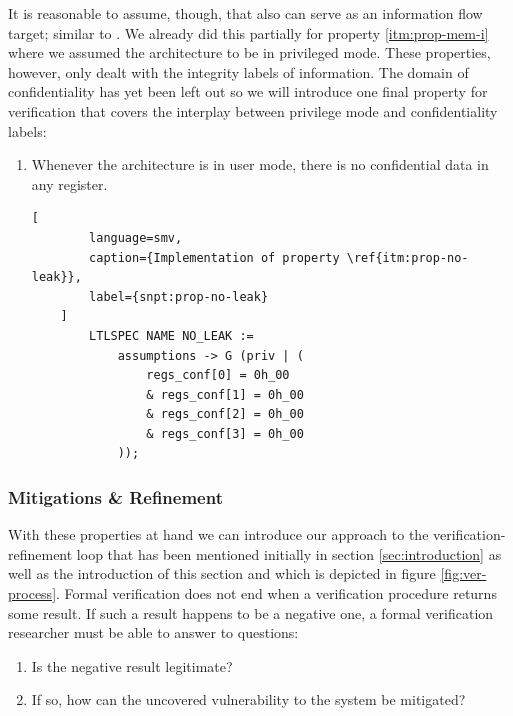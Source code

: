 It is reasonable to assume, though, that  also can serve as an information flow target; similar to .
We already did this partially for property \ref{itm:prop-mem-i} where we assumed the architecture to be in privileged mode.
These properties, however, only dealt with the integrity labels of information.
The domain of confidentiality has yet been left out so we will introduce one final property for verification that covers the interplay between privilege mode and confidentiality labels:
\begin{enumerate}[label=\Roman*.,resume]
    \item \label{itm:prop-no-leak}
    Whenever the architecture is in user mode, there is no confidential data in any register.

    \begin{lstlisting}[
        language=smv,
        caption={Implementation of property \ref{itm:prop-no-leak}},
        label={snpt:prop-no-leak}
    ]
        LTLSPEC NAME NO_LEAK :=
            assumptions -> G (priv | (
                regs_conf[0] = 0h_00
                & regs_conf[1] = 0h_00
                & regs_conf[2] = 0h_00
                & regs_conf[3] = 0h_00
            ));
    \end{lstlisting}
\end{enumerate}


\subsubsection{Mitigations \& Refinement}

With these properties at hand we can introduce our approach to the verification-refinement loop that has been mentioned initially in section \ref{sec:introduction} as well as the introduction of this section and which is depicted in figure \ref{fig:ver-process}.
Formal verification does not end when a verification procedure returns some result.
If such a result happens to be a negative one, a formal verification researcher must be able to answer to questions:
\begin{enumerate}
    \item \label{itm:counter-ex-validity}
    Is the negative result legitimate?
    \item \label{itm:counter-ex-mitigation}
    If so, how can the uncovered vulnerability to the system be mitigated?
\end{enumerate}

